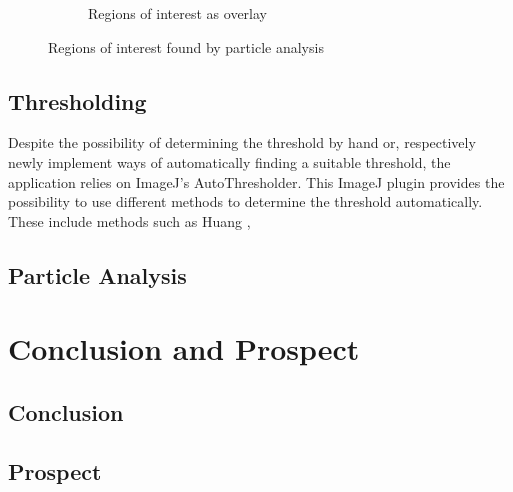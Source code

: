 \documentclass[a4paper, 11pt]{article}
\begin{document}
\begin{figure}[h]
\begin{subfigure}[b]{0.23\textwidth}
\caption{Regions of interest as overlay}
\end{subfigure}
\caption{Regions of interest found by particle analysis}
\end{figure}

\subsection{Thresholding}\label{sec:thresholding}
Despite the possibility of determining the threshold by hand or, respectively
newly implement ways of automatically finding a suitable threshold, the
application relies on ImageJ's AutoThresholder. This ImageJ plugin provides the
possibility to use different methods to determine the threshold automatically.
These include methods such as Huang \cite{huang93}, 

\subsection{Particle Analysis}\label{sec:particle_analysis}

\newpage
\section{Conclusion and Prospect}

\subsection{Conclusion}

\subsection{Prospect}


\newpage
{}

\end{document}

